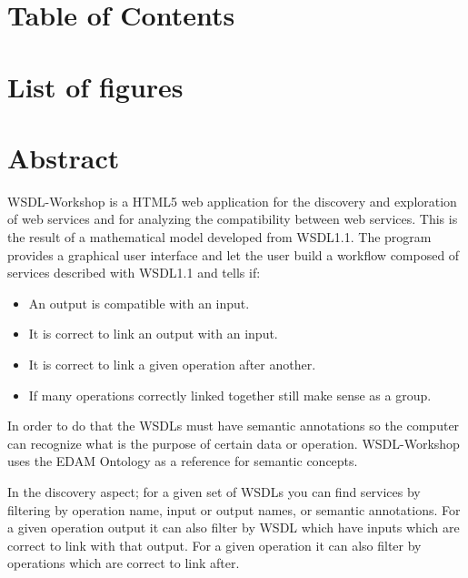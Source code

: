 \documentclass[a4paper,10pt]{article}
\begin{document}
\newpage

\section{Table of Contents}

  \tableofcontents


\section{List of figures}

  \listoffigures

\newpage

\section{Abstract}

WSDL-Workshop is a HTML5 web application for the discovery and exploration of web services and for analyzing the compatibility between web services. This is the result of a mathematical model developed from WSDL1.1. The program provides a graphical user interface and let the user build a workflow composed of services described with WSDL1.1 and tells if:

\begin{itemize}
  \item An output is compatible with an input.
  \item It is correct to link an output with an input.
  \item It is correct to link a given operation after another.
  \item If many operations correctly linked together still make sense as a group.
\end{itemize}

In order to do that the WSDLs must have semantic annotations so the computer can recognize what is the purpose of certain data or operation. WSDL-Workshop uses the EDAM Ontology as a reference for semantic concepts.\vspace{3 mm}

In the discovery aspect; for a given set of WSDLs you can find services by filtering by operation name, input or output names, or semantic annotations. For a given operation output it can also filter by WSDL which have inputs which are correct to link with that output. For a given operation it can also filter by operations which are correct to link after.\vspace{3 mm}
\end{document}

